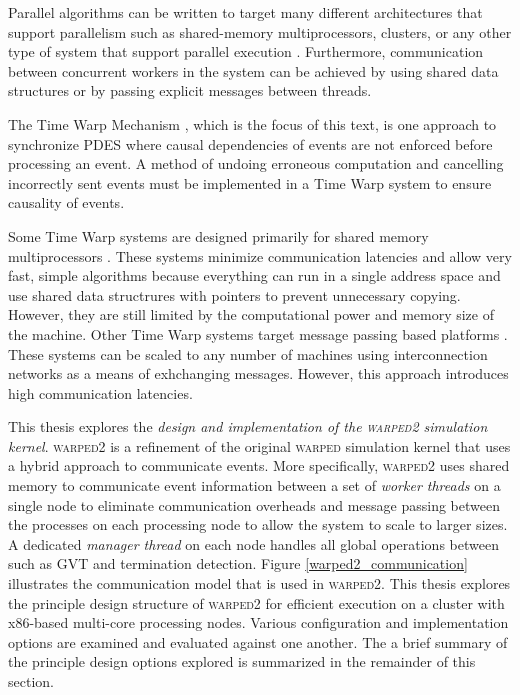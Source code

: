 \documentclass[11pt]{book}
\begin{document}
Parallel algorithms can be written to target many different architectures that support
parallelism such as shared-memory multiprocessors, clusters, or any other type of system
that support parallel execution \cite{culler-97,patterson-11}.  Furthermore, communication
between concurrent workers in the system can be achieved by using shared data structures
or by passing explicit messages between threads.

The Time Warp Mechanism \cite{jefferson-85}, which is the focus of this text, is one approach
to synchronize PDES where causal dependencies of events are not enforced before processing
an event.  A method of undoing erroneous computation and cancelling incorrectly sent
events must be implemented in a Time Warp system to ensure causality of events. 

Some Time Warp systems are designed primarily for shared memory multiprocessors
\cite{das-94}.  These systems minimize communication latencies and allow very fast, simple
algorithms because everything can run in a single address space and use shared data
structrures with pointers to prevent unnecessary copying.  However, they are still limited
by the computational power and memory size of the machine.  Other Time Warp systems target
message passing based platforms \cite{carothers-00,ramanan-98-iscope}.  These systems can
be scaled to any number of machines using interconnection networks as a means of
exhchanging messages.  However, this approach introduces high communication latencies.

This thesis explores the \emph{design and implementation of the \textsc{warped2}
  simulation kernel}.  \textsc{warped2} is a refinement of the original \textsc{warped}
simulation kernel \cite{martin-96,ramanan-98-iscope} that uses a hybrid approach to
communicate events.  More specifically, \textsc{warped2} uses shared memory to communicate
event information between a set of \emph{worker threads} on a single node to eliminate
communication overheads and message passing between the processes on each processing node
to allow the system to scale to larger sizes.  A dedicated \emph{manager thread} on each
node handles all global operations between such as GVT and termination detection.  Figure
\ref{warped2_communication} illustrates the communication model that is used in
\textsc{warped2}.  This thesis explores the principle design structure of \textsc{warped2}
for efficient execution on a cluster with x86-based multi-core processing nodes.  Various
configuration and implementation options are examined and evaluated against one another.
The a brief summary of the principle design options explored is summarized in the
remainder of this section.
\end{document}
